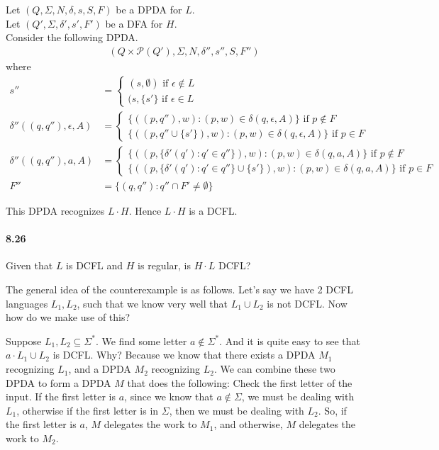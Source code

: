 \documentclass{article}
\begin{document}
Let $(Q, \Sigma, N, \delta, s, S, F)$ be a DPDA for $L$.\\
Let $(Q', \Sigma, \delta', s', F')$ be a DFA for $H$.\\

Consider the following DPDA.
\begin{align*}
	(Q\times \mathcal{P}(Q'), \Sigma, N, \delta'', s'', S, F'')
\end{align*}
where
\begin{align*}
s''&=
\begin{cases}
(s, \emptyset) \text{ if }\epsilon \notin L\\
(s, \{s'\} \text{ if }\epsilon \in L
\end{cases}
\\
\delta''((q, q''), \epsilon, A)&=
\begin{cases}
\{((p, q''), w) : (p, w)\in \delta(q, \epsilon, A)\} \text{ if }p\notin F\\
\{((p, q'' \cup \{s'\}), w) : (p, w)\in \delta(q, \epsilon, A)\} \text{ if }p\in F
\end{cases}
\\
\delta''((q, q''), a, A)&=
\begin{cases}
\{((p, \{\delta'(q') : q'\in q''\}), w) : (p, w)\in \delta(q, a, A)\} \text{ if }p\notin F\\
\{((p, \{\delta'(q') : q'\in q''\} \cup \{s'\}), w) : (p, w)\in \delta(q, a, A)\} \text{ if }p\in F
\end{cases}
\\
F''&=\{(q, q'') : q''\cap F'\neq \emptyset\}
\end{align*}

This DPDA recognizes $L\cdot H$. Hence $L\cdot H$ is a DCFL.

\paragraph{8.26} Given that $L$ is DCFL and $H$ is regular, is $H\cdot L$ DCFL?

The general idea of the counterexample is as follows. Let's say we have 2 DCFL languages $L_1, L_2$, such that we know very well that $L_1\cup L_2$ is not DCFL. Now how do we make use of this?

Suppose $L_1, L_2\subseteq \Sigma^*$. We find some letter $a\notin \Sigma^*$. And it is quite easy to see that $a\cdot L_1\cup L_2$ is DCFL. Why? Because we know that there exists a DPDA $M_1$ recognizing $L_1$, and a DPDA $M_2$ recognizing $L_2$. We can combine these two DPDA to form a DPDA $M$ that does the following: Check the first letter of the input. If the first letter is $a$, since we know that $a\notin \Sigma$, we must be dealing with $L_1$, otherwise if the first letter is in $\Sigma$, then we must be dealing with $L_2$. So, if the first letter is $a$, $M$ delegates the work to $M_1$, and otherwise, $M$ delegates the work to $M_2$.
\end{document}
